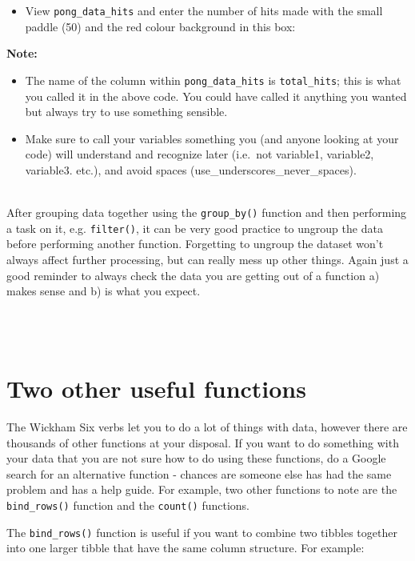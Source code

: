 \documentclass[]{book}
\providecommand{\tightlist}{%
  \setlength{\itemsep}{0pt}\setlength{\parskip}{0pt}}
\newenvironment{try}
    {
    \hline\\
    }
    { 
    \\\\\hline
    }
\begin{document}
\begin{itemize}
\tightlist
\item
  View \texttt{pong\_data\_hits} and enter the number of hits made with the small paddle (50) and the red colour background in this box: 
\end{itemize}

\textbf{Note:}

\begin{itemize}
\item
  The name of the column within \texttt{pong\_data\_hits} is \texttt{total\_hits}; this is what you called it in the above code. You could have called it anything you wanted but always try to use something sensible.
\item
  Make sure to call your variables something you (and anyone looking at your code) will understand and recognize later (i.e.~not variable1, variable2, variable3. etc.), and avoid spaces (use\_underscores\_never\_spaces).
\end{itemize}

\begin{try}
After grouping data together using the \texttt{group\_by()} function and
then performing a task on it, e.g. \texttt{filter()}, it can be very
good practice to ungroup the data before performing another function.
Forgetting to ungroup the dataset won't always affect further
processing, but can really mess up other things. Again just a good
reminder to always check the data you are getting out of a function a)
makes sense and b) is what you expect.
\end{try}

\hypertarget{two-other-useful-functions}{%
\section{Two other useful functions}\label{two-other-useful-functions}}

The Wickham Six verbs let you to do a lot of things with data, however there are thousands of other functions at your disposal. If you want to do something with your data that you are not sure how to do using these functions, do a Google search for an alternative function - chances are someone else has had the same problem and has a help guide. For example, two other functions to note are the \texttt{bind\_rows()} function and the \texttt{count()} functions.

The \texttt{bind\_rows()} function is useful if you want to combine two tibbles together into one larger tibble that have the same column structure. For example:
\end{document}
